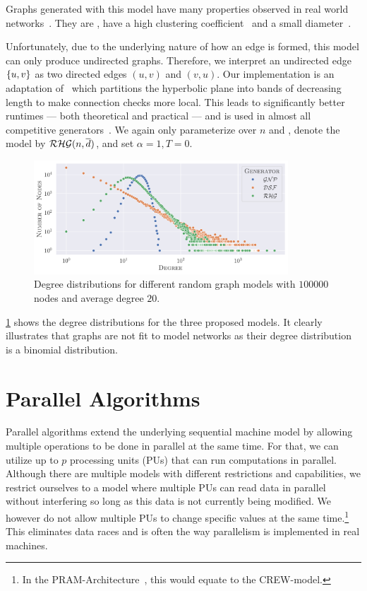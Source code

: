 Graphs generated with this model have many properties observed in real world networks~\cite{TreewidthRHG}.
They are , have a high clustering coefficient~\cite{PowerlawRHG} and a small diameter~\cite{DiameterRHG1, DiameterRHG2}.

Unfortunately, due to the underlying nature of how an edge is formed, this model can only produce undirected graphs.
Therefore, we interpret an undirected edge $\left\{u, v\right\}$ as two directed edges $(u, v)$ and $(v, u)$.
Our implementation is an adaptation of~\cite{DBLP:journals/corr/LoozOLM16} which partitions the hyperbolic plane into bands of decreasing length to make connection checks more local.
This leads to significantly better runtimes --- both theoretical and practical --- and is used in almost all competitive generators~\cite{DBLP:journals/corr/LoozOLM16, HyperGen, DBLP:journals/corr/GIRG}.
We again only parameterize over $n$ and \degavg, denote the model by $\mathcal{RHG}(n, \overline{d})$, and set $\alpha = 1, T = 0$.

\begin{figure}[t]
  \centering
  \includegraphics[width=0.85\textwidth]{Figures/Preliminaries/degrees.pdf}
  \caption{Degree distributions for different random graph models with $100 000$ nodes and average degree $20$.}
  \label{fig:degrees}
\end{figure}

\cref{fig:degrees} shows the degree distributions for the three proposed models.
It clearly illustrates that \gnp graphs are not fit to model  networks as their degree distribution is a binomial distribution.


\section{Parallel Algorithms}
Parallel algorithms extend the underlying sequential machine model by allowing multiple operations to be done in parallel at the same time.
For that, we can utilize up to $p$ processing units (PUs) that can run computations in parallel.
Although there are multiple models with different restrictions and capabilities, we restrict ourselves to a model where multiple PUs can read data in parallel without interfering so long as this data is not currently being modified.
We however do not allow multiple PUs to change specific values at the same time.\footnote{In the PRAM-Architecture~\cite{PRAM}, this would equate to the CREW-model.}
This eliminates data races and is often the way parallelism is implemented in real machines.

